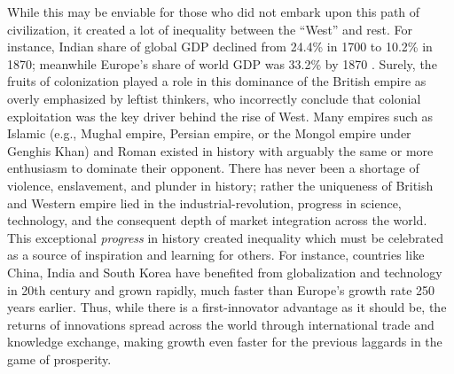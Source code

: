 \documentclass[12pt]{article}
\newcommand{\1}{\mathbbm 1}
\begin{document}
		
		While this may be enviable for those who did not embark upon this path of civilization, it created a lot of inequality between the ``West'' and rest. For instance, Indian share of global GDP declined from 24.4\% in 1700 to 10.2\% in 1870; meanwhile Europe's share of world GDP was 33.2\% by 1870 \cite{maddison2006world}. Surely, the fruits of colonization played a role in this dominance of the British empire as overly emphasized by leftist thinkers, who incorrectly conclude that colonial exploitation was the key driver behind the rise of West. Many empires such as Islamic (e.g., Mughal empire, Persian empire, or the Mongol empire under Genghis Khan) and Roman existed in history with arguably the same or more enthusiasm to dominate their opponent. There has never been a shortage of violence, enslavement, and plunder in history; rather the uniqueness of British and Western empire lied in the industrial-revolution, progress in science, technology, and the consequent depth of market integration across the world.  This exceptional \textit{progress} in history created inequality which must be celebrated as a source of inspiration and learning for others. For instance, countries like China, India and South Korea have benefited from globalization and technology in 20th century and grown rapidly, much faster than Europe's growth rate 250 years earlier. Thus, while there is a first-innovator advantage as it should be, the returns of innovations spread across the world through international trade and knowledge exchange, making growth even faster for the previous laggards in the game of prosperity.
		
		
		
		
		
		
	 
		
		
		
		
		
\end{document}
